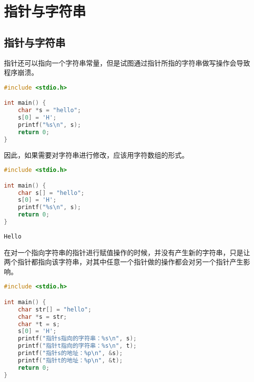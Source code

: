 \newpage

\section{指针与字符串}

\subsection{指针与字符串}

指针还可以指向一个字符串常量，但是试图通过指针所指的字符串做写操作会导致程序崩溃。\\


\begin{lstlisting}[language=C]
#include <stdio.h>

int main() {
    char *s = "hello";
    s[0] = 'H';
    printf("%s\n", s);
    return 0;
}
\end{lstlisting}

因此，如果需要对字符串进行修改，应该用字符数组的形式。\\


\begin{lstlisting}[language=C]
#include <stdio.h>

int main() {
    char s[] = "hello";
    s[0] = 'H';
    printf("%s\n", s);
    return 0;
}
\end{lstlisting}

\begin{tcolorbox}
	\begin{verbatim}
Hello
	\end{verbatim}
\end{tcolorbox}

在对一个指向字符串的指针进行赋值操作的时候，并没有产生新的字符串，只是让两个指针都指向该字符串，对其中任意一个指针做的操作都会对另一个指针产生影响。\\


\begin{lstlisting}[language=C]
#include <stdio.h>

int main() {
    char str[] = "hello";
    char *s = str;
    char *t = s;
    s[0] = 'H';
    printf("指针s指向的字符串：%s\n", s);
    printf("指针t指向的字符串：%s\n", t);
    printf("指针s的地址：%p\n", &s);
    printf("指针t的地址：%p\n", &t);
    return 0;
}
\end{lstlisting}

